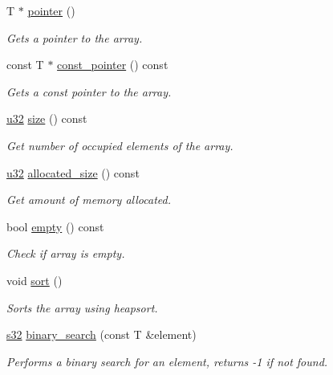 \begin{DoxyCompactItemize}
T $\ast$ \hyperlink{classirr_1_1core_1_1array_a7b29797486e1c2ab3e7821082dab998c}{pointer} ()
\begin{DoxyCompactList}\small\item\em Gets a pointer to the array. \end{DoxyCompactList}\item 
const T $\ast$ \hyperlink{classirr_1_1core_1_1array_a8df928a9e555327c085b20f392e409ee}{const\+\_\+pointer} () const
\begin{DoxyCompactList}\small\item\em Gets a const pointer to the array. \end{DoxyCompactList}\item 
\hyperlink{namespaceirr_a0416a53257075833e7002efd0a18e804}{u32} \hyperlink{classirr_1_1core_1_1array_ab10777d1bb278c29e159ec59b5dc9378}{size} () const
\begin{DoxyCompactList}\small\item\em Get number of occupied elements of the array. \end{DoxyCompactList}\item 
\hyperlink{namespaceirr_a0416a53257075833e7002efd0a18e804}{u32} \hyperlink{classirr_1_1core_1_1array_a21e5b20b7a56ba174b19b6c36c78a14b}{allocated\+\_\+size} () const
\begin{DoxyCompactList}\small\item\em Get amount of memory allocated. \end{DoxyCompactList}\item 
bool \hyperlink{classirr_1_1core_1_1array_a956ee1019455016e21e218b61f6371ca}{empty} () const
\begin{DoxyCompactList}\small\item\em Check if array is empty. \end{DoxyCompactList}\item 
void \hyperlink{classirr_1_1core_1_1array_a870e52dd57dd67a9d59e5ca5f82bca94}{sort} ()
\begin{DoxyCompactList}\small\item\em Sorts the array using heapsort. \end{DoxyCompactList}\item 
\hyperlink{namespaceirr_ac66849b7a6ed16e30ebede579f9b47c6}{s32} \hyperlink{classirr_1_1core_1_1array_a35412f669b983eaaf3792b82966db24a}{binary\+\_\+search} (const T \&element)
\begin{DoxyCompactList}\small\item\em Performs a binary search for an element, returns -\/1 if not found. \end{DoxyCompactList}\item 

\end{DoxyCompactItemize}
